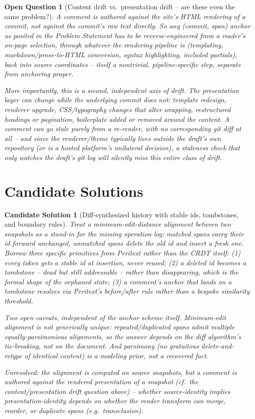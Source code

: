 \documentclass{amsart}
\newtheorem{oq}{Open Question}
\newtheorem{sol}{Candidate Solution}
\theoremstyle{remark}
\begin{document}
    \begin{oq}[Content drift vs.\ presentation drift -- are these even the same problem?]
        A comment is authored against the site's HTML rendering of a commit, not against the commit's raw text directly. So any (commit, span) anchor as posited in the Problem Statement has to be reverse-engineered from a reader's on-page selection, through whatever the rendering pipeline is (templating, markdown/prose-to-HTML conversion, syntax highlighting, included partials), back into source coordinates -- itself a nontrivial, pipeline-specific step, separate from anchoring proper.

        More importantly, this is a second, independent axis of drift. The presentation layer can change while the underlying commit does not: template redesign, renderer upgrade, CSS/typography changes that alter wrapping, restructured headings or pagination, boilerplate added or removed around the content. A comment can go stale purely from a re-render, with no corresponding git diff at all -- and since the renderer/theme typically lives outside the draft's own repository (or is a hosted platform's unilateral decision), a staleness check that only watches the draft's git log will silently miss this entire class of drift.
    \end{oq}

    \section{Candidate Solutions}
    \begin{sol}[Diff-synthesized history with stable ids, tombstones, and boundary rules]
        Treat a minimum-edit-distance alignment between two snapshots as a stand-in for the missing operation log: matched spans carry their id forward unchanged, unmatched spans delete the old id and insert a fresh one. Borrow three specific primitives from Peritext rather than the CRDT itself: (1) every token gets a stable id at insertion, never reused; (2) a deleted id becomes a tombstone -- dead but still addressable -- rather than disappearing, which is the formal shape of the \emph{orphaned} state; (3) a comment's anchor that lands on a tombstone resolves via Peritext's before/after rule rather than a bespoke similarity threshold.

        Two open caveats, independent of the anchor scheme itself. Minimum-edit alignment is not generically unique: repeated/duplicated spans admit multiple equally-parsimonious alignments, so the answer depends on the diff algorithm's tie-breaking, not on the document. And parsimony (no gratuitous delete-and-retype of identical content) is a modeling prior, not a recovered fact.

        Unresolved: the alignment is computed on source snapshots, but a comment is authored against the \emph{rendered} presentation of a snapshot (cf.\ the content/presentation drift question above) -- whether source-identity implies presentation-identity depends on whether the render transform can merge, reorder, or duplicate spans (e.g.\ transclusion).
    \end{sol}
\end{document}
